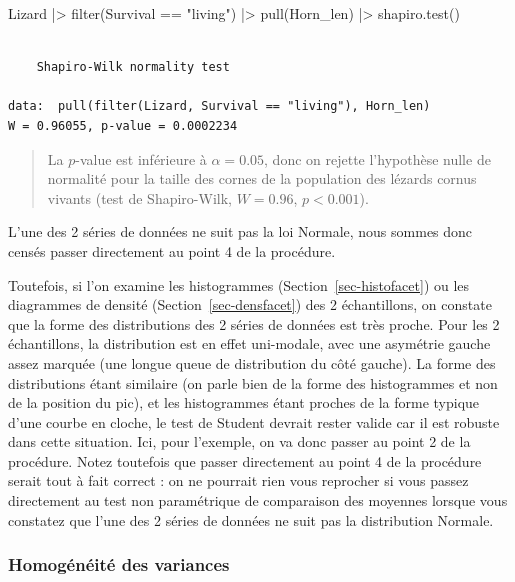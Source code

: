 \documentclass[
  french,
  a4paper,
  DIV=11,
  numbers=noendperiod,
  oneside]{scrreprt}
\newenvironment{Shaded}{}{}
\newcommand{\FunctionTok}[1]{\textcolor[rgb]{0.44,0.26,0.76}{#1}}
\newcommand{\NormalTok}[1]{\textcolor[rgb]{0.14,0.16,0.18}{#1}}
\newcommand{\SpecialCharTok}[1]{\textcolor[rgb]{0.00,0.36,0.77}{#1}}
\newcommand{\StringTok}[1]{\textcolor[rgb]{0.01,0.18,0.38}{#1}}
\begin{document}
\begin{Shaded}
\begin{Highlighting}[]
\NormalTok{Lizard }\SpecialCharTok{|\textgreater{}}
  \FunctionTok{filter}\NormalTok{(Survival }\SpecialCharTok{==} \StringTok{"living"}\NormalTok{) }\SpecialCharTok{|\textgreater{}}
  \FunctionTok{pull}\NormalTok{(Horn\_len) }\SpecialCharTok{|\textgreater{}}
  \FunctionTok{shapiro.test}\NormalTok{()}
\end{Highlighting}
\end{Shaded}

\begin{verbatim}

    Shapiro-Wilk normality test

data:  pull(filter(Lizard, Survival == "living"), Horn_len)
W = 0.96055, p-value = 0.0002234
\end{verbatim}

\begin{quote}
La \(p\)-value est inférieure à \(\alpha = 0.05\), donc on rejette
l'hypothèse nulle de normalité pour la taille des cornes de la
population des lézards cornus vivants (test de Shapiro-Wilk,
\(W = 0.96\), \(p < 0.001\)).
\end{quote}

L'une des 2 séries de données ne suit pas la loi Normale, nous sommes
donc censés passer directement au point 4 de la procédure.

Toutefois, si l'on examine les histogrammes
(Section~\ref{sec-histofacet}) ou les diagrammes de densité
(Section~\ref{sec-densfacet}) des 2 échantillons, on constate que la
forme des distributions des 2 séries de données est très proche. Pour
les 2 échantillons, la distribution est en effet uni-modale, avec une
asymétrie gauche assez marquée (une longue queue de distribution du côté
gauche). La forme des distributions étant similaire (on parle bien de la
forme des histogrammes et non de la position du pic), et les
histogrammes étant proches de la forme typique d'une courbe en cloche,
le test de Student devrait rester valide car il est robuste dans cette
situation. Ici, pour l'exemple, on va donc passer au point 2 de la
procédure. Notez toutefois que passer directement au point 4 de la
procédure serait tout à fait correct : on ne pourrait rien vous
reprocher si vous passez directement au test non paramétrique de
comparaison des moyennes lorsque vous constatez que l'une des 2 séries
de données ne suit pas la distribution Normale.

\subsubsection{Homogénéité des
variances}\label{homoguxe9nuxe9ituxe9-des-variances}
\end{document}

